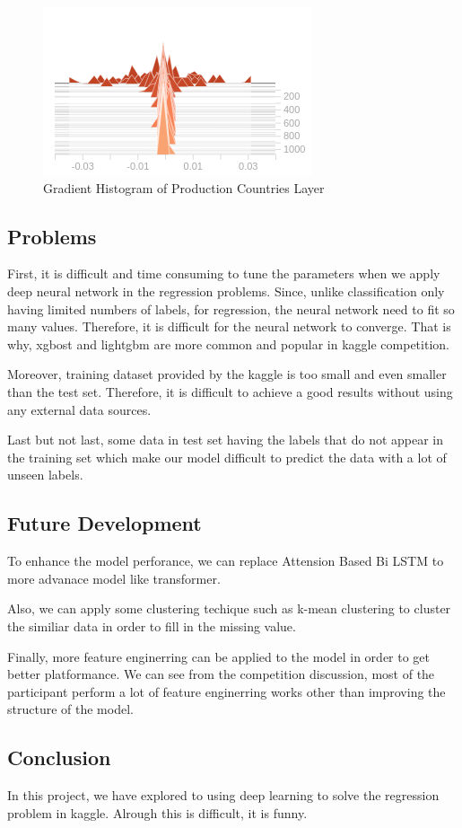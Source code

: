 \documentclass{article}
\begin{document}
\begin{figure}[h]
  \centering
  \includegraphics[scale=1]{linear_2.png}
  \caption{Gradient Histogram of Production Countries Layer}
\end{figure}

\pagebreak


\subsection{Problems}

First, it is difficult and time consuming to tune the parameters when we apply deep neural network in the regression problems. Since, unlike classification only having limited numbers of labels, for regression, the neural network need to fit so many values. Therefore, it is difficult for the neural network to converge. That is why, xgbost and lightgbm are more common and popular in kaggle competition. 

Moreover, training dataset provided by the kaggle is too small and even smaller than the test set. Therefore, it is difficult to achieve a good results without using any external data sources.

Last but not last, some data in test set having the labels that do not appear in the training set which make our model difficult to predict the data with a lot of unseen labels.

\subsection{Future Development}

To enhance the model perforance, we can replace Attension Based Bi LSTM to more advanace model like transformer.

Also, we can apply some clustering techique such as k-mean clustering to cluster the similiar data in order to fill in the missing value.

Finally, more feature enginerring can be applied to the model in order to get better platformance. We can see from the competition discussion, most of the participant perform a lot of feature enginerring works other than improving the structure of the model. 

\subsection{Conclusion}

In this project, we have explored to using deep learning to solve the regression problem in kaggle. Alrough this is difficult, it is funny.
\end{document}
